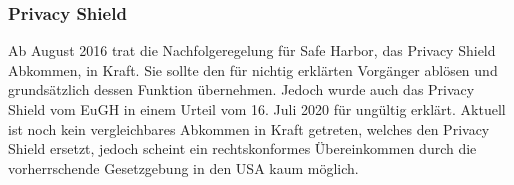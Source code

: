 \subsubsection{Privacy Shield}
    Ab August 2016 trat die Nachfolgeregelung für Safe Harbor, das Privacy Shield Abkommen, in Kraft. Sie sollte den für nichtig erklärten Vorgänger ablösen und grundsätzlich dessen Funktion übernehmen. Jedoch wurde auch das Privacy Shield vom EuGH in einem Urteil vom 16. Juli 2020 für ungültig erklärt. Aktuell ist noch kein vergleichbares Abkommen in Kraft getreten, welches den Privacy Shield ersetzt, jedoch scheint ein rechtskonformes Übereinkommen durch die vorherrschende Gesetzgebung in den USA kaum möglich.
\vfill